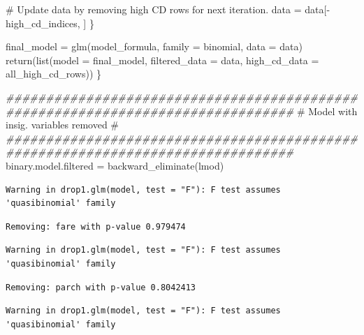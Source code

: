 \documentclass[
  letterpaper,
  DIV=11,
  numbers=noendperiod]{scrartcl}
\newenvironment{Shaded}{\begin{snugshade}}{\end{snugshade}}
\newcommand{\AttributeTok}[1]{\textcolor[rgb]{0.40,0.45,0.13}{#1}}
\newcommand{\CommentTok}[1]{\textcolor[rgb]{0.37,0.37,0.37}{#1}}
\newcommand{\DocumentationTok}[1]{\textcolor[rgb]{0.37,0.37,0.37}{\textit{#1}}}
\newcommand{\FunctionTok}[1]{\textcolor[rgb]{0.28,0.35,0.67}{#1}}
\newcommand{\NormalTok}[1]{\textcolor[rgb]{0.00,0.23,0.31}{#1}}
\newcommand{\OtherTok}[1]{\textcolor[rgb]{0.00,0.23,0.31}{#1}}
\newcommand{\SpecialCharTok}[1]{\textcolor[rgb]{0.37,0.37,0.37}{#1}}
\begin{document}
\begin{Shaded}
\begin{Highlighting}[]
    \CommentTok{\# Update data by removing high CD rows for next iteration.}
\NormalTok{    data }\OtherTok{=}\NormalTok{ data[}\SpecialCharTok{{-}}\NormalTok{high\_cd\_indices, ]}
\NormalTok{  \}}
  
\NormalTok{  final\_model }\OtherTok{=} \FunctionTok{glm}\NormalTok{(model\_formula, }\AttributeTok{family =}\NormalTok{ binomial, }\AttributeTok{data =}\NormalTok{ data)}
  \FunctionTok{return}\NormalTok{(}\FunctionTok{list}\NormalTok{(}\AttributeTok{model =}\NormalTok{ final\_model, }\AttributeTok{filtered\_data =}\NormalTok{ data, }\AttributeTok{high\_cd\_data =}\NormalTok{ all\_high\_cd\_rows))}
\NormalTok{\}}
\end{Highlighting}
\end{Shaded}

\begin{Shaded}
\begin{Highlighting}[]
\DocumentationTok{\#\#\#\#\#\#\#\#\#\#\#\#\#\#\#\#\#\#\#\#\#\#\#\#\#\#\#\#\#\#\#\#\#\#\#\#\#\#\#\#\#\#\#\#\#\#\#\#\#\#\#\#\#\#\#\#\#\#\#\#\#\#\#\#\#\#\#\#\#\#\#\#\#\#\#\#\#\#\#\#}
\CommentTok{\#                    Model with insig. variables removed                      \# }
\DocumentationTok{\#\#\#\#\#\#\#\#\#\#\#\#\#\#\#\#\#\#\#\#\#\#\#\#\#\#\#\#\#\#\#\#\#\#\#\#\#\#\#\#\#\#\#\#\#\#\#\#\#\#\#\#\#\#\#\#\#\#\#\#\#\#\#\#\#\#\#\#\#\#\#\#\#\#\#\#\#\#\#\#}
\NormalTok{binary.model.filtered }\OtherTok{=} \FunctionTok{backward\_eliminate}\NormalTok{(lmod)}
\end{Highlighting}
\end{Shaded}

\begin{verbatim}
Warning in drop1.glm(model, test = "F"): F test assumes 'quasibinomial' family
\end{verbatim}

\begin{verbatim}
Removing: fare with p-value 0.979474 
\end{verbatim}

\begin{verbatim}
Warning in drop1.glm(model, test = "F"): F test assumes 'quasibinomial' family
\end{verbatim}

\begin{verbatim}
Removing: parch with p-value 0.8042413 
\end{verbatim}

\begin{verbatim}
Warning in drop1.glm(model, test = "F"): F test assumes 'quasibinomial' family
\end{verbatim}
\end{document}
